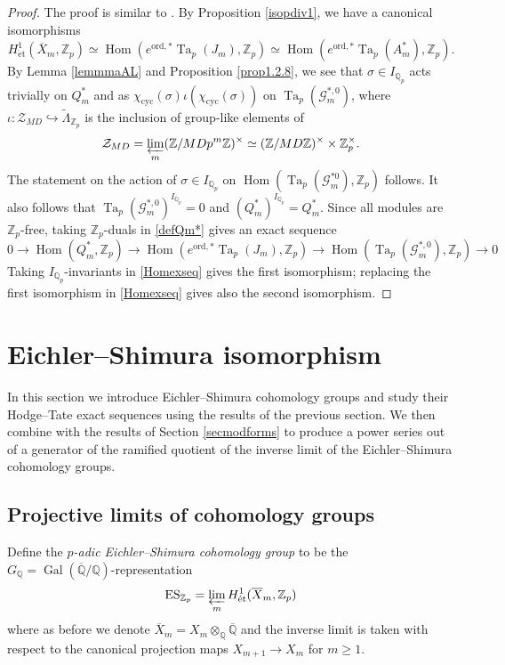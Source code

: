 \documentclass[a4paper,11pt]{amsart}
\numberwithin{equation}{section}
\theoremstyle{plain}
\theoremstyle{definition}
\theoremstyle{remark}
\newcommand{\Q}{\mathbb{Q}}
\newcommand{\Z}{\mathbb{Z}}
\DeclareMathOperator{\Hom}{Hom}
\DeclareMathOperator{\Gal}{Gal}
\DeclareMathOperator{\Ta}{Ta}
\newcommand{\cyc}{{\mathrm{cyc}}}
\newcommand{\ord}{\mathrm{ord}}
\newcommand{\ES}{\mathrm{ES}}
\newcommand{\et}{\mathrm{\acute{e}t}}
\newcommand{\invlim}{\mathop{\varprojlim}\limits}
\begin{document}
\begin{proof}
    The proof is similar to \cite[Proposition--Definition (1.3.6)]{OhtaMA}.
    By Proposition \ref{isopdiv1}, we have a canonical isomorphisms
    \[H^1_{\et}(\overline{X}_m,\Z_p)\simeq \Hom(e^{\ord,* }\Ta_p(J_m),\Z_p)\simeq \Hom(e^{\ord,* }\Ta_p(A_m^*),\Z_p).\] By Lemma \ref{lemmmaAL} and Proposition \ref{prop1.2.8}, we see that $\sigma\in I_{\Q_p}$ acts trivially on $Q_m^*$ and as $\chi_\cyc(\sigma)\iota(\chi_\cyc(\sigma))$ on $\Ta_p(\mathcal{G}_m^{*,0})$, where $\iota\colon \mathcal{Z}_{MD}\hookrightarrow \widetilde{\Lambda}_{\Z_p}$ is the inclusion of group-like elements of 
    \begin{equation}\label{ZMD}
    \mathcal{Z}_{MD}=\invlim_m(\Z/MDp^m\Z)^\times\simeq (\Z/MD\Z)^\times\times\Z_p^\times.\end{equation} 
    The statement on the action of $\sigma\in I_{\Q_p}$ on $\Hom(\Ta_p(\mathcal{G}_m^{*0}),\Z_p)$ follows.
    It also follows that $\Ta_p(\mathcal{G}_m^{*,0})^{I_{\Q_p}}=0$ and $(Q_m^*)^{I_{\Q_p}}=Q_m^*$. 
    Since all modules are $\Z_p$-free, taking $\Z_p$-duals in \eqref{defQm*} gives an exact sequence 
    \begin{equation}\label{Homexseq}
    0\longrightarrow \Hom(Q_m^*,\Z_p)\longrightarrow \Hom(e^{\ord,*}\Ta_p(J_m),\Z_p)\longrightarrow 
    \Hom(\Ta_p(\mathcal{G}_m^{*,0}),\Z_p)\longrightarrow 0\end{equation}
Taking $I_{\Q_p}$-invariants in \eqref{Homexseq} gives the first isomorphism; replacing the first isomorphism in \eqref{Homexseq} gives also the second isomorphism.
\end{proof}



 \section{Eichler--Shimura isomorphism}\label{sec.ESisom}
In this section we introduce Eichler--Shimura cohomology groups and study their Hodge--Tate exact sequences
using the results of the previous section. We then combine with the results of Section \ref{secmodforms} 
to produce a power series out of a generator of the ramified quotient of the inverse limit of the 
Eichler--Shimura cohomology groups. 
 
\subsection{Projective limits of cohomology groups}\label{secProjlim}
Define the \emph{$p$-adic Eichler--Shimura cohomology group} to be the $G_\Q=\Gal(\overline{\Q}/\Q)$-representation  
\[\ES_{\Z_p}=\invlim_m H^1_\text{\'et}(\overline{X}_m,\Z_p)\]
where as before we denote $\overline{X}_m=X_m\otimes_\Q\overline{\Q}$ and the inverse limit is taken with respect to the canonical projection maps $X_{m+1}\rightarrow X_{m}$ for $m\geq 1$.
\end{document}
